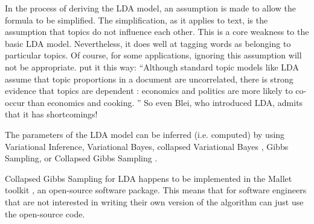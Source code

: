 
In the process of deriving the LDA model, an assumption is made to allow the formula to be simplified. The simplification, as it applies to text, is the assumption that topics do not influence each other. This is a core weakness to the basic LDA model. Nevertheless, it does well at tagging words as belonging to particular topics. Of course, for some applications, ignoring this assumption will not be appropriate. \citeauthor{arora2013practical} put it this way: ``Although standard topic models like LDA \citep{blei2003latent} assume that topic proportions in a document are uncorrelated, there is strong evidence that topics are dependent \citep{blei2007correlated, li2006pachinko}: economics and politics are more likely to co-occur than economics and cooking. \citeyearpar{arora2013practical}'' So even Blei, who introduced LDA, admits that it has shortcomings! %

The parameters of the LDA model can be inferred (i.e. computed) by using Variational Inference, Variational Bayes, collapsed Variational Bayes \citep{teh2006collapsed, blei2006variational, NIPS2010_3902}, Gibbs Sampling, or Collapsed Gibbs Sampling \citep{Porteous:2008:FCG:1401890.1401960}. %

Collapsed Gibbs Sampling for LDA happens to be implemented in the Mallet toolkit \citep{McCallumMALLET}, an open-source software package. This means that for software engineers that are not interested in writing their own version of the algorithm can just use the open-source code. %







